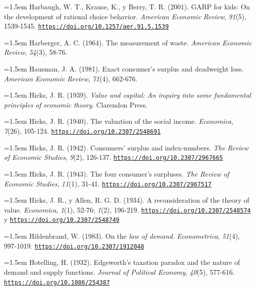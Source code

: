 \documentclass[10pt,a4paper]{article}
\begin{document}
\noindent\hangindent=1.5em Harbaugh, W. T., Krause, K., y Berry, T. R. (2001). GARP for kids: On the development of rational choice behavior. \textit{American Economic Review}, \textit{91}(5), 1539-1545. \href{https://doi.org/10.1257/aer.91.5.1539}{\nolinkurl{https://doi.org/10.1257/aer.91.5.1539}}

\noindent\hangindent=1.5em Harberger, A. C. (1964). The measurement of waste. \textit{American Economic Review}, \textit{54}(3), 58-76.

\noindent\hangindent=1.5em Hausman, J. A. (1981). Exact consumer's surplus and deadweight loss. \textit{American Economic Review}, \textit{71}(4), 662-676.

\noindent\hangindent=1.5em Hicks, J. R. (1939). \textit{Value and capital: An inquiry into some fundamental principles of economic theory}. Clarendon Press.

{\sloppy\noindent\hangindent=1.5em Hicks, J. R. (1940). The valuation of the social income. \textit{Economica}, \textit{7}(26), 105-124. \href{https://doi.org/10.2307/2548691}{\nolinkurl{https://doi.org/10.2307/2548691}}\par}

\noindent\hangindent=1.5em Hicks, J. R. (1942). Consumers' surplus and index-numbers. \textit{The Review of Economic Studies}, \textit{9}(2), 126-137. \href{https://doi.org/10.2307/2967665}{\nolinkurl{https://doi.org/10.2307/2967665}}

\noindent\hangindent=1.5em Hicks, J. R. (1943). The four consumer's surpluses. \textit{The Review of Economic Studies}, \textit{11}(1), 31-41. \href{https://doi.org/10.2307/2967517}{\nolinkurl{https://doi.org/10.2307/2967517}}

{\sloppy\noindent\hangindent=1.5em Hicks, J. R., y Allen, R. G. D. (1934). A reconsideration of the theory of value. \textit{Economica}, \textit{1}(1), 52-76; \textit{1}(2), 196-219. \href{https://doi.org/10.2307/2548574}{\nolinkurl{https://doi.org/10.2307/2548574}} y \href{https://doi.org/10.2307/2548749}{\nolinkurl{https://doi.org/10.2307/2548749}}\par}

\noindent\hangindent=1.5em Hildenbrand, W. (1983). On the \textit{law of demand}. \textit{Econometrica}, \textit{51}(4), 997-1019. \href{https://doi.org/10.2307/1912048}{\nolinkurl{https://doi.org/10.2307/1912048}}

\noindent\hangindent=1.5em Hotelling, H. (1932). Edgeworth's taxation paradox and the nature of demand and supply functions. \textit{Journal of Political Economy}, \textit{40}(5), 577-616. \href{https://doi.org/10.1086/254387}{\nolinkurl{https://doi.org/10.1086/254387}}
\end{document}
